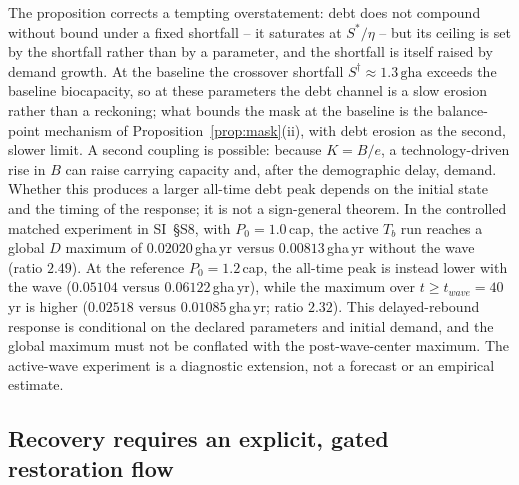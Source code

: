 \documentclass[preprint,12pt,authoryear]{elsarticle}
\begin{document}
The proposition corrects a tempting overstatement: debt does not compound without bound under a fixed shortfall -- it saturates at $S^*/\eta$ -- but its ceiling is set by the shortfall rather than by a parameter, and the shortfall is itself raised by demand growth. At the baseline the crossover shortfall $S^\dagger\approx1.3\,\mathrm{gha}$ exceeds the baseline biocapacity, so at these parameters the debt channel is a slow erosion rather than a reckoning; what bounds the mask at the baseline is the balance-point mechanism of Proposition~\ref{prop:mask}(ii), with debt erosion as the second, slower limit. A second coupling is possible: because $K=B/e$, a technology-driven rise in $B$ can raise carrying capacity and, after the demographic delay, demand. Whether this produces a larger all-time debt peak depends on the initial state and the timing of the response; it is not a sign-general theorem. In the controlled matched experiment in SI~\S S8, with $P_0=1.0$\,cap, the active $T_b$ run reaches a global $D$ maximum of $0.02020$\,gha\,yr versus $0.00813$\,gha\,yr without the wave (ratio $2.49$). At the reference $P_0=1.2$\,cap, the all-time peak is instead lower with the wave ($0.05104$ versus $0.06122$\,gha\,yr), while the maximum over $t\ge t_{wave}=40$\,yr is higher ($0.02518$ versus $0.01085$\,gha\,yr; ratio $2.32$). This delayed-rebound response is conditional on the declared parameters and initial demand, and the global maximum must not be conflated with the post-wave-center maximum. The active-wave experiment is a diagnostic extension, not a forecast or an empirical estimate.

\subsection{Recovery requires an explicit, gated restoration flow}\label{sec:recovery}
\end{document}
